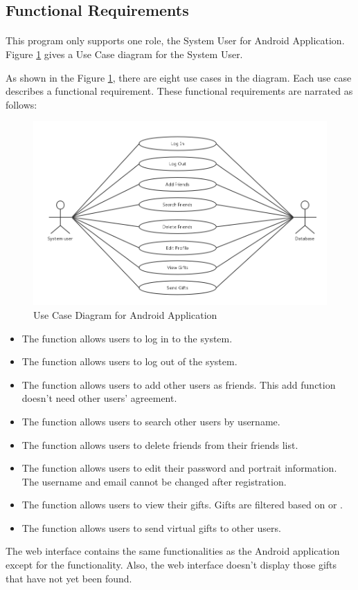\subsection{Functional Requirements}
\label{FunctionalRequirements}
\paragraph{}
This program only supports one role, the System User for Android Application. Figure \ref{Use Cases Diagram} gives a Use Case diagram for the System User.
\par As shown in the Figure \ref{Use Cases Diagram}, there are eight use cases in the diagram. Each use case describes a functional requirement. These functional requirements are narrated as follows:

\begin{figure}[htb]
\centering
\includegraphics[width=.5\textwidth]{section02/assets/UseCase.png}
\caption[Use Case Diagram for Android Application]{\label{Use Cases Diagram}Use Case Diagram for Android Application}
\end{figure}

\begin{itemize}
\item The  function allows users to log in to the system.
\item The  function allows users to log out of the system.
\item The  function allows users to add other users as friends. This add function doesn't need other users' agreement.
\item The  function allows users to search other users by username.
\item The  function allows users to delete friends from their friends list.
\item The  function allows users to edit their password and portrait information. The username and email cannot be changed after registration. 
\item The  function allows users to view their gifts. Gifts are filtered based on  or .
\item The  function allows users to send virtual gifts to other users.
\end{itemize}
\par The web interface contains the same functionalities as the Android application except for the  functionality.  Also, the web interface doesn't display those gifts that have not yet been found.
